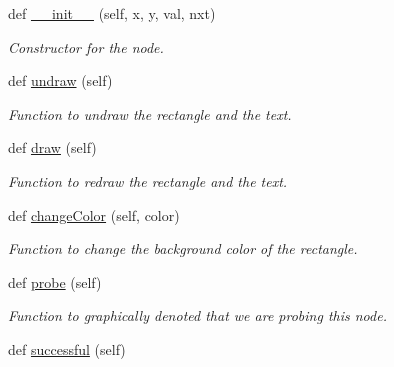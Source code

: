 \begin{DoxyCompactItemize}
\item 
def \hyperlink{class_hash_table_1_1_node_a7ff8b9136684e4b25aa1f3db517558c8}{\+\_\+\+\_\+init\+\_\+\+\_\+} (self, x, y, val, nxt)
\begin{DoxyCompactList}\small\item\em Constructor for the node. \end{DoxyCompactList}\item 
\mbox{\label{class_hash_table_1_1_node_a96f5ccb7ad28ecb75e074deca933caa0}} 
def \hyperlink{class_hash_table_1_1_node_a96f5ccb7ad28ecb75e074deca933caa0}{undraw} (self)
\begin{DoxyCompactList}\small\item\em Function to undraw the rectangle and the text. \end{DoxyCompactList}\item 
\mbox{\label{class_hash_table_1_1_node_a1c3dea5412211e136a85961fb383f8f8}} 
def \hyperlink{class_hash_table_1_1_node_a1c3dea5412211e136a85961fb383f8f8}{draw} (self)
\begin{DoxyCompactList}\small\item\em Function to redraw the rectangle and the text. \end{DoxyCompactList}\item 
def \hyperlink{class_hash_table_1_1_node_a9910292e3eb760e33b7e4d471b5868fe}{change\+Color} (self, color)
\begin{DoxyCompactList}\small\item\em Function to change the background color of the rectangle. \end{DoxyCompactList}\item 
\mbox{\label{class_hash_table_1_1_node_abc01ce8dac8b6a475ac5c24d8bac39b3}} 
def \hyperlink{class_hash_table_1_1_node_abc01ce8dac8b6a475ac5c24d8bac39b3}{probe} (self)
\begin{DoxyCompactList}\small\item\em Function to graphically denoted that we are probing this node. \end{DoxyCompactList}\item 
\mbox{\label{class_hash_table_1_1_node_a93d0cde2243e732764d7c81f43e545e7}} 
def \hyperlink{class_hash_table_1_1_node_a93d0cde2243e732764d7c81f43e545e7}{successful} (self)

\end{DoxyCompactItemize}
